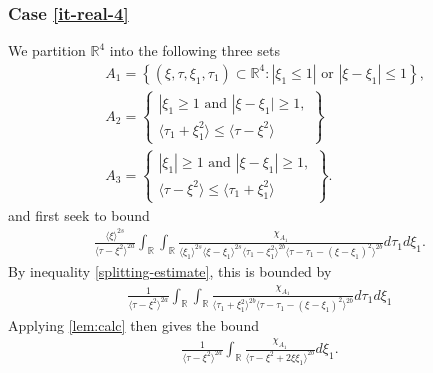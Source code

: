 \documentclass[12pt,reqno]{amsart}
\numberwithin{equation}{section}  %
\numberwithin{figure}{section}
\newcommand{\rr}{\mathbb{R}}
\theoremstyle{plain}
\theoremstyle{definition}
\theoremstyle{remark}
\begin{document}
\subsubsection{Case \eqref{it-real-4}} 
\label{sssec:case-it-real-4}
We partition $\rr^{4}$ into the following three sets 
%
%
\begin{equation*}
\begin{split}
  & A_{1} = \left\{ (\xi, \tau, \xi_{1}, \tau_{1}) \subset \rr^{4}: |
  \xi_{1} \le 1 | \text{ or } | \xi - \xi_{1} | \le 1 \right\},
  \\
  & A_{2} = 
  \begin{Bmatrix}
    | \xi_{1} \ge 1 \text{ and } | \xi - \xi_{1} | \ge 1,
    \\
    \langle \tau_{1} + \xi_{1}^{2} \rangle  \le \langle \tau -
  \xi^{2} \rangle
\end{Bmatrix}
  \\
  & A_{3} = 
  \begin{Bmatrix}
    | \xi_{1} | \ge 1 \text{ and } | \xi - \xi_{1} | \ge 1,
    \\
    \langle \tau - \xi^{2} \rangle  \le \langle \tau_{1} + \xi_{1}^{2} \rangle 
  \end{Bmatrix}.
\end{split}
\end{equation*}
%
and first seek to bound
%
%
\begin{equation}
  \label{case-2-region-1}
  \begin{split}
    \frac{ \langle \xi
    \rangle ^{2s}}{\langle \tau - \xi^{2} \rangle ^{2a}}
    \int_{\rr} \int_{\rr} \frac{\chi_{A_{1}}}{ \langle \xi_{1} \rangle ^{2s} \langle \xi-\xi_{1} \rangle ^{2s} 
    \langle \tau_{1} - \xi_{1}^{2} \rangle^{2b} \langle  \tau - \tau_{1} -
    (\xi - \xi_{1})^{2} \rangle^{2b} }
    d \tau_1 d \xi_{1}.
  \end{split}
\end{equation}
By inequality \eqref{splitting-estimate}, this is bounded by
%
%
\begin{equation*}
\begin{split}
  \frac{1}{\langle \tau - \xi^{2} \rangle ^{2a}} \int_{\rr} \int_{\rr}
  \frac{\chi_{A_{1}}}{\langle \tau_{1} + \xi_{1}^{2} \rangle ^{2b} \langle \tau
  - \tau_{1} - ( \xi - \xi_{1})^{2}\rangle ^{2b}} d \tau_{1} d \xi_{1}
\end{split}
\end{equation*}
%
%
Applying \autoref{lem:calc} then gives the bound
%
%
\begin{equation}
\begin{split}
  \frac{1}{\langle \tau - \xi^{2} \rangle ^{2a}} \int_{\rr}
  \frac{\chi_{A_{1}}}{\langle \tau - \xi^{2} + 2 \xi \xi_{1} \rangle ^{2b}} d
  \xi_{1}.
\end{split}
\label{region-1-case-2-pre-est}
\end{equation}
\end{document}
